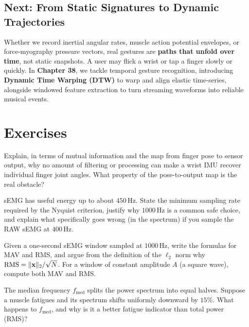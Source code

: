 \subsection{Next: From Static Signatures to Dynamic Trajectories}
Whether we record inertial angular rates, muscle action potential envelopes, or force-myography pressure vectors, real gestures are \textbf{paths that unfold over time}, not static snapshots. A user may flick a wrist or tap a finger slowly or quickly. In \textbf{Chapter 38}, we tackle temporal gesture recognition, introducing \textbf{Dynamic Time Warping (DTW)} to warp and align elastic time-series, alongside windowed feature extraction to turn streaming waveforms into reliable musical events.

\section{Exercises}
\label{ch37:exercises}

\begin{exercise}
Explain, in terms of mutual information and the map from finger pose to sensor output,
why no amount of filtering or processing can make a wrist IMU
recover individual finger joint angles. What property of the pose-to-output map is the
real obstacle?
\end{exercise}

\begin{exercise}
sEMG has useful energy up to about $450$\,Hz. State the minimum sampling rate required
by the Nyquist criterion, justify why $1000$\,Hz is a common safe choice, and explain
what specifically goes wrong (in the spectrum) if you sample the RAW sEMG at $400$\,Hz.
\end{exercise}

\begin{exercise}
Given a one-second sEMG window sampled at $1000$\,Hz, write the formulas for MAV and
RMS, and argue from the definition of the $\ell_2$ norm why
$\text{RMS} = \lVert\mathbf{x}\rVert_2 / \sqrt{N}$. For a window of constant amplitude $A$
(a square wave), compute both MAV and RMS.
\end{exercise}

\begin{exercise}
The median frequency $f_{\mathrm{med}}$ splits the power spectrum into equal halves.
Suppose a muscle fatigues and its spectrum shifts uniformly downward by $15\%$. What
happens to $f_{\mathrm{med}}$, and why is it a better fatigue indicator than total
power (RMS)?
\end{exercise}

